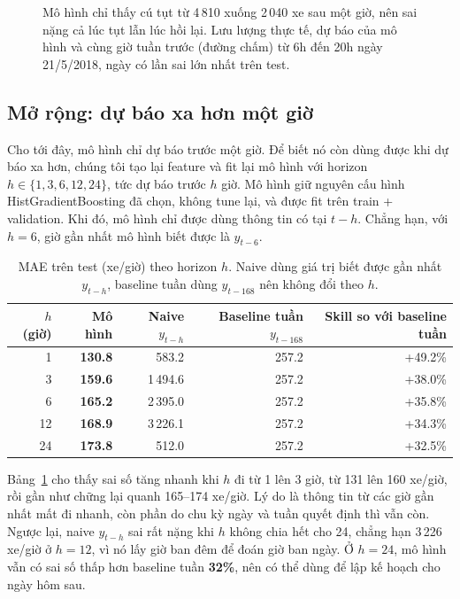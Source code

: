 \begin{figure}[H]
\centering
{}
\caption{Mô hình chỉ thấy cú tụt từ 4\,810 xuống 2\,040 xe sau một giờ, nên sai nặng cả lúc tụt lẫn lúc hồi lại. Lưu lượng thực tế, dự
báo của mô hình và cùng giờ tuần trước (đường chấm) từ 6h đến 20h ngày 21/5/2018, ngày có lần sai lớn nhất trên test.}
\label{fig:ts-worst}
\end{figure}

\subsection{Mở rộng: dự báo xa hơn một giờ}
\label{sec:ts-horizon}
Cho tới đây, mô hình chỉ dự báo trước một giờ. Để biết nó còn dùng được khi dự báo xa hơn, chúng tôi tạo lại feature và fit lại mô hình với
horizon $h \in \{1, 3, 6, 12, 24\}$, tức dự báo trước $h$ giờ. Mô hình giữ nguyên cấu hình HistGradientBoosting đã chọn, không tune lại, và
được fit trên train + validation. Khi đó, mô hình chỉ được dùng thông tin có tại $t-h$. Chẳng hạn, với $h = 6$, giờ gần
nhất mô hình biết được là $y_{t-6}$.

\begin{table}[H]
\centering
\caption{MAE trên test (xe/giờ) theo horizon $h$. Naive dùng giá trị biết được gần nhất $y_{t-h}$, baseline tuần dùng $y_{t-168}$ nên không đổi theo $h$.}
\label{tab:ts-horizon}
\small
\begin{tabular}{rrrrr}
\toprule
$h$ (giờ) & Mô hình & Naive $y_{t-h}$ & Baseline tuần $y_{t-168}$ & Skill so với baseline tuần\\
\midrule
1 & \textbf{130.8} & 583.2 & 257.2 & +49.2\%\\
3 & \textbf{159.6} & 1\,494.6 & 257.2 & +38.0\%\\
6 & \textbf{165.2} & 2\,395.0 & 257.2 & +35.8\%\\
12 & \textbf{168.9} & 3\,226.1 & 257.2 & +34.3\%\\
24 & \textbf{173.8} & 512.0 & 257.2 & +32.5\%\\
\bottomrule
\end{tabular}
\end{table}

Bảng~\ref{tab:ts-horizon} cho thấy sai số tăng nhanh khi $h$ đi từ 1 lên 3 giờ, từ 131 lên 160 xe/giờ, rồi gần như chững lại quanh 165--174
xe/giờ. Lý do là thông tin từ các giờ gần nhất mất đi nhanh, còn phần do chu kỳ ngày và tuần quyết định thì vẫn còn. Ngược lại, naive
$y_{t-h}$ sai rất nặng khi $h$ không chia hết cho 24, chẳng hạn 3\,226 xe/giờ ở $h = 12$, vì nó lấy giờ ban đêm để đoán giờ ban ngày. Ở
$h = 24$, mô hình vẫn có sai số thấp hơn baseline tuần \textbf{32\%}, nên có thể dùng để lập kế hoạch cho ngày hôm sau.

